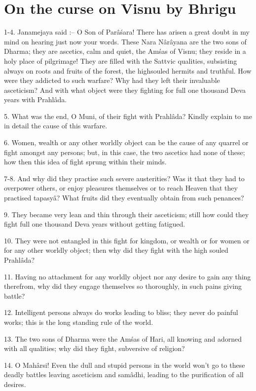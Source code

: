 ﻿\chapter{On the curse on Visnu by Bhrigu}

1-4. Janamejaya said :-- O Son of Par\^a\'sara! There has arisen a great doubt in my mind on hearing just now your words. These Nara N\^ar\^ayana are the two sons of Dharma; they are ascetics, calm and quiet, the Am\'sas of Visnu; they reside in a holy place of pilgrimage! They are filled with the Sattvic qualities, subsisting always on roots and fruits of the forest, the highsouled hermits and truthful. How were they addicted to such warfare? Why had they left their invaluable asceticism? And with what object were they fighting for full one thousand Deva years with Prahl\^ada.

5. What was the end, O Muni, of their fight with Prahl\^ada? Kindly explain to me in detail the cause of this warfare.

6. Women, wealth or any other worldly object can be the cause of any quarrel or fight amongst any persons; but, in this case, the two ascetics had none of these; how then this idea of fight sprung within their minds.

7-8. And why did they practise such severe austerities? Was it that they had to overpower others, or enjoy pleasures themselves or to reach Heaven that they practised tapasy\^a? What fruits did they eventually obtain from such penances?

9. They became very lean and thin through their asceticism; still how could they fight full one thousand Deva years without getting fatigued.

10. They were not entangled in this fight for kingdom, or wealth or for women or for any other worldly object; then why did they fight with the high souled Prahl\^ada?

11. Having no attachment for any worldly object nor any desire to gain any thing therefrom, why did they engage themselves so thoroughly, in such pains giving battle?

12. Intelligent persons always do works leading to bliss; they never do painful works; this is the long standing rule of the world.

13. The two sons of Dharma were the Am\'sas of Hari, all knowing and adorned with all qualities; why did they fight, subversive of religion?

14. O Mah\^arsi! Even the dull and stupid persons in the world won't go to these deadly battles leaving asceticism and sam\^adhi, leading to the purification of all desires.

